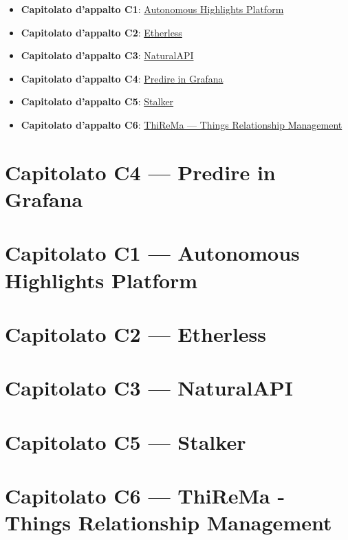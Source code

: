 \documentclass{article}
\begin{document}
\begin{itemize}
  \item \textbf{Capitolato d'appalto C1}: \href{https://www.math.unipd.it/~tullio/IS-1/2019/Progetto/C1.pdf}{Autonomous Highlights Platform}
  \item \textbf{Capitolato d'appalto C2}: \href{https://www.math.unipd.it/~tullio/IS-1/2019/Progetto/C2.pdf}{Etherless}
  \item \textbf{Capitolato d'appalto C3}: \href{https://www.math.unipd.it/~tullio/IS-1/2019/Progetto/C3.pdf}{NaturalAPI}
  \item \textbf{Capitolato d'appalto C4}: \href{https://www.math.unipd.it/~tullio/IS-1/2019/Progetto/C4.pdf}{Predire in Grafana}
  \item \textbf{Capitolato d'appalto C5}: \href{https://www.math.unipd.it/~tullio/IS-1/2019/Progetto/C5.pdf}{Stalker}
  \item \textbf{Capitolato d'appalto C6}: \href{https://www.math.unipd.it/~tullio/IS-1/2019/Progetto/C6.pdf}{ThiReMa --- Things Relationship Management}
\end{itemize}

\newpage
\section{Capitolato C4 --- Predire in Grafana}%
\label{sec:c4}


\newpage
\section{Capitolato C1 --- Autonomous Highlights Platform}%
\label{sec:c1}


\newpage
\section{Capitolato C2 --- Etherless}%
\label{sec:c2}


\newpage
\section{Capitolato C3 ---  NaturalAPI}%
\label{sec:c3}


\newpage
\section{Capitolato C5 --- Stalker}%
\label{sec:c5}


\newpage
\section{Capitolato C6 --- ThiReMa - Things Relationship Management}%
\label{sec:c6}

\end{document}
